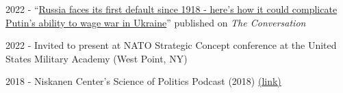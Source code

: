 \documentclass[letterpaper]{article}
\renewenvironment{itemize}{
  \begin{list}{}{
    \setlength{\leftmargin}{1.75em}
  }
}{
  \end{list}
}
\begin{document}
\begin{itemize}
	\item 2022 - ``\href{https://theconversation.com/russia-faces-first-foreign-default-since-1918-heres-how-it-could-complicate-putins-ability-to-wage-war-in-ukraine-181139}{Russia faces its first default since 1918 - here's how it could complicate Putin's ability to wage war in Ukraine}'' published on \emph{The Conversation}
	\item 2022 - Invited to present at NATO Strategic Concept conference at the United States Military Academy (West Point, NY)
	\item 2018 - Niskanen Center's Science of Politics Podcast (2018)  \href{https://www.niskanencenter.org/episode-15-how-debt-finance-leads-to-war-and-defense-spending/}{(link)} 
 
 \end{itemize}
\end{document}
